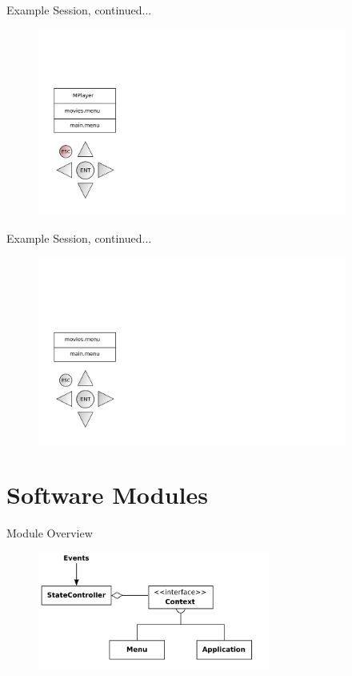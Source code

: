 \documentclass[style=smrt,mode=present,paper=screen]{powerdot}
\begin{document}
\begin{slide}[toc=,bm=]{Example Session, continued...}
\begin{figure}[htb]
	\includegraphics[width=4in]{figures/example-session-10}
\end{figure}
\end{slide}

\begin{slide}[toc=,bm=]{Example Session, continued...}
\begin{figure}[htb]
	\includegraphics[width=4in]{figures/example-session-11}
\end{figure}
\end{slide}


\section{Software Modules}
\begin{slide}{Module Overview}
\begin{figure}
\includegraphics[width=3in]{../lib/figures/modular_overview}
\end{figure}
\end{slide}
\end{document}
